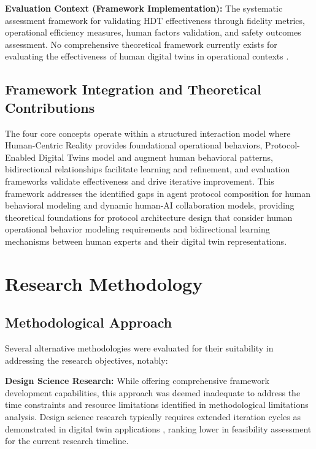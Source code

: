 \documentclass[12pt,a4paper]{article}
\begin{document}
\textbf{Evaluation Context (Framework Implementation):} The systematic assessment framework for validating HDT effectiveness through fidelity metrics, operational efficiency measures, human factors validation, and safety outcomes assessment. No comprehensive theoretical framework currently exists for evaluating the effectiveness of human digital twins in operational contexts \cite{10.1109/etfa61755.2024.10711109} \cite{10.1016/j.ifacol.2022.09.675}.

\subsection{Framework Integration and Theoretical Contributions}

The four core concepts operate within a structured interaction model where Human-Centric Reality provides foundational operational behaviors, Protocol-Enabled Digital Twins model and augment human behavioral patterns, bidirectional relationships facilitate learning and refinement, and evaluation frameworks validate effectiveness and drive iterative improvement. This framework addresses the identified gaps in agent protocol composition for human behavioral modeling and dynamic human-AI collaboration models, providing theoretical foundations for protocol architecture design that consider human operational behavior modeling requirements and bidirectional learning mechanisms between human experts and their digital twin representations.

\section{Research Methodology}
\label{sec:methodology}

\subsection{Methodological Approach}

Several alternative methodologies were evaluated for their suitability in addressing the research objectives, notably:

\textbf{Design Science Research:} While offering comprehensive framework development capabilities, this approach was deemed inadequate to address the time constraints and resource limitations identified in methodological limitations analysis. Design science research typically requires extended iteration cycles as demonstrated in digital twin applications \cite{10.1016/j.esr.2024.101334}, ranking lower in feasibility assessment for the current research timeline.
\end{document}
